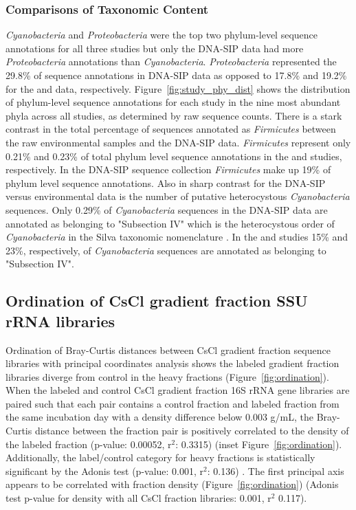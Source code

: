 \subsubsection{Comparisons of Taxonomic Content} 
\textit{Cyanobacteria} and \textit{Proteobacteria} were the top two phylum-level sequence annotations for all three studies but only the DNA-SIP data had more \textit{Proteobacteria} annotations than \textit{Cyanobacteria}. \textit{Proteobacteria} represented the 29.8\% of sequence annotations in DNA-SIP data as opposed to 17.8\% and 19.2\% for the \citet{Garcia_Pichel_2013} and \citet{Steven_2013} data, respectively. Figure~\ref{fig:study_phy_dist} shows the distribution of phylum-level sequence annotations for each study in the nine most abundant  phyla across all studies, as determined by raw sequence counts. There is a stark contrast in the total percentage of sequences annotated as \textit{Firmicutes} between the raw environmental samples and the DNA-SIP data. \textit{Firmicutes} represent only 0.21\% and 0.23\% of total phylum level sequence annotations in the \citet{Steven_2013} and \citet{Garcia_Pichel_2013} studies, respectively. In the DNA-SIP sequence collection \textit{Firmicutes} make up 19\% of phylum level sequence annotations. Also in sharp contrast for the DNA-SIP versus environmental data is the number of putative heterocystous \textit{Cyanobacteria} sequences. Only 0.29\% of \textit{Cyanobacteria} sequences in the DNA-SIP data are annotated as belonging to "Subsection IV" which is the heterocystous order of \textit{Cyanobacteria} in the Silva taxonomic nomenclature \citep{17947321}. In the \citet{Steven_2013} and \citet{Garcia_Pichel_2013} studies 15\% and 23\%, respectively, of \textit{Cyanobacteria} sequences are annotated as belonging to "Subsection IV".  

\subsection{Ordination of CsCl gradient fraction SSU rRNA libraries} Ordination
of Bray-Curtis \citep{Bray_1957} distances between CsCl gradient fraction
sequence libraries with principal coordinates analysis shows the labeled
gradient fraction libraries diverge from control in the heavy fractions
(Figure~\ref{fig:ordination}). When the labeled and control CsCl gradient
fraction 16S rRNA gene libraries are paired such that each pair contains a
control fraction and labeled fraction from the same incubation day with a
density difference below 0.003 g/mL, the Bray-Curtis distance between the
fraction pair is positively correlated to the density of the labeled fraction
(p-value: 0.00052, r$^{2}$: 0.3315) (inset Figure~\ref{fig:ordination}).
Additionally, the label/control category for heavy fractions is statistically
significant by the Adonis test (p-value: 0.001, r$^{2}$: 0.136)
\citep{Anderson_2001}. The first principal axis appears to be correlated with
fraction density (Figure~\ref{fig:ordination}) (Adonis test p-value for density
with all CsCl fraction libraries: 0.001, r$^{2}$ 0.117).

